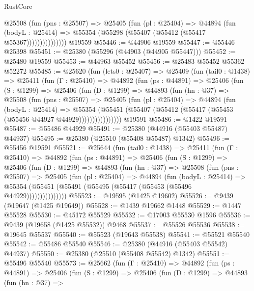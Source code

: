 \begin{lexlean}{RustCore}
\begin{coremodule}
                  @25508
                    (fun (pns : @25507) =>
                    @25405
                      (fun (pl : @25404) =>
                      @44894
                        (fun (bodyL : @25414) =>
                        @55354 (@55298 (@55407 (@55412 (@55417 @55367)))))))))))))))
    @19559
@55446 := @44906 @19559
@55447 := @55446 @25398
@55451 := @25380 (@55296 (@44903 (@44905 @55447)))
@55452 := @25480 @19559
@55453 := @44963 @55452
@55456 := @25483 @55452 @55362 @52272
@55485 := @25620
    (fun (lets0 : @25407) =>
    @25409
      (fun (tail0 : @1438) =>
      @25411
        (fun (Γ : @25410) =>
        @44892
          (fun (ps : @44891) =>
          @25406
            (fun (S : @1299) =>
            @25406
              (fun (D : @1299) =>
              @44893
                (fun (hn : @37) =>
                @25508
                  (fun (pns : @25507) =>
                  @25405
                    (fun (pl : @25404) =>
                    @44894
                      (fun (bodyL : @25414) =>
                      @55354
                        (@55451
                          (@55407 (@55412 (@55417 (@55453 (@55456 @44927 @44929))))))))))))))))
    @19591
@55486 := @1422 @19591
@55487 := @55486 @44929
@55491 := @25380 (@44916 (@55403 @55487) @44937)
@55495 := @25380 (@25510 (@55408 @55487) @1342)
@55496 := @55456 @19591
@55521 := @25644
    (fun (tail0 : @1438) =>
    @25411
      (fun (Γ : @25410) =>
      @44892
        (fun (ps : @44891) =>
        @25406
          (fun (S : @1299) =>
          @25406
            (fun (D : @1299) =>
            @44893
              (fun (hn : @37) =>
              @25508
                (fun (pns : @25507) =>
                @25405
                  (fun (pl : @25404) =>
                  @44894
                    (fun (bodyL : @25414) =>
                    @55354 (@55451 (@55491 (@55495 (@55417 (@55453 (@55496 @44929)))))))))))))))
@55523 := @19595 (@1425 @19602)
@55526 := @9439 (@19647 (@1425 @19649))
@55528 := @1439 @19662 @1448
@55529 := @1447 @55528
@55530 := @45172 @55529
@55532 := @17003 @55530 @1596
@55536 := @9439 (@19658 (@1425 @55532)) @9468
@55537 := @55526 @55536
@55538 := @19645 @55537
@55540 := @55523 (@19643 @55538)
@55541 := @55521 @55540
@55542 := @55486 @55540
@55546 := @25380 (@44916 (@55403 @55542) @44937)
@55550 := @25380 (@25510 (@55408 @55542) @1342)
@55551 := @55496 @55540
@55573 := @25662
    (fun (Γ : @25410) =>
    @44892
      (fun (ps : @44891) =>
      @25406
        (fun (S : @1299) =>
        @25406
          (fun (D : @1299) =>
          @44893
            (fun (hn : @37) =>

\end{coremodule}
\end{lexlean}
